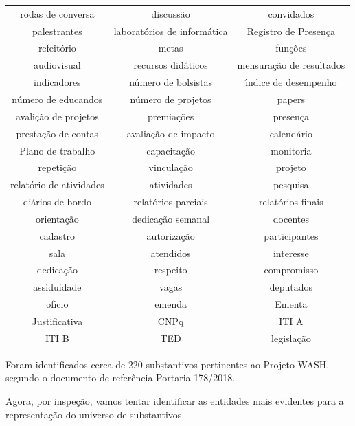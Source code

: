 \documentclass[
12pt,		%
openright,	%
twoside,  %
a4paper,			%
chapter=TITLE,		%
english,			%
french,				%
spanish,			%
brazil				%
]{USPSC-classe/USPSC_RedarTex}
\begin{document}
\begin{table}[htb]
\begin{tabular}{|c|c|c|}
rodas de conversa  &  discuss\~ao  &  convidados \\
palestrantes  &  laborat\'orios de inform\'atica  &  Registro de Presen\c{c}a \\
refeit\'orio  &  metas  &  fun\c{c}\~oes \\
audiovisual  &  recursos did\'aticos  &  mensura\c{c}\~ao de resultados \\
indicadores  &  n\'umero de bolsistas  &  \'{\i}ndice de desempenho \\
n\'umero de educandos  &  n\'umero de projetos  &  papers \\
avali\c{c}\~ao de projetos  &  premia\c{c}\~oes  &  presen\c{c}a  \\
presta\c{c}\~ao de contas  &  avalia\c{c}\~ao de impacto  &  calend\'ario \\
Plano de trabalho  &  capacita\c{c}\~ao  &  monitoria \\
repeti\c{c}\~ao  &  vincula\c{c}\~ao  &  projeto \\
relat\'orio de atividades  &  atividades  &  pesquisa \\
di\'arios de bordo  &  relat\'orios parciais  &  relat\'orios finais \\
orienta\c{c}\~ao  &  dedica\c{c}\~ao semanal  &  docentes \\
cadastro  &  autoriza\c{c}\~ao  &  participantes \\
sala  &  atendidos  &  interesse \\
dedica\c{c}\~ao  &  respeito  &  compromisso \\
assiduidade  &  vagas  &  deputados \\
of\'{\i}cio  &  emenda  &  Ementa \\
Justificativa  &  CNPq  &  ITI A \\
ITI B  &  TED  &  legisla\c{c}\~ao \\
\hline
\end{tabular}
\end{table}


Foram identificados cerca de 220 substantivos pertinentes ao Projeto WASH, segundo o documento de refer\^encia Portaria 178/2018.










Agora, por inspe\c{c}\~ao, vamos tentar identificar as entidades mais evidentes para a representa\c{c}\~ao do universo de substantivos.
\end{document}
